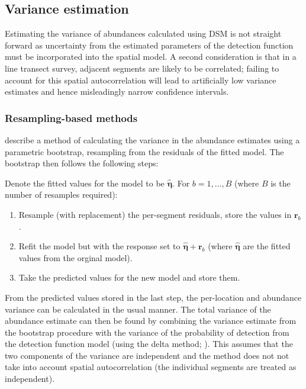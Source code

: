 \documentclass[a4paper,12pt]{article}
\begin{document}
\subsection*{Variance estimation}

Estimating the variance of abundances calculated using DSM is not straight forward as uncertainty from the estimated parameters of the detection function must be incorporated into the spatial model. A second consideration is that in a line transect survey, adjacent segments are likely to be correlated; failing to account for this spatial autocorrelation will lead to artificially low variance estimates and hence misleadingly narrow confidence intervals.

\subsubsection*{Resampling-based methods}

\cite{Hedley:2004et} describe a method of calculating the variance in the abundance estimates using a parametric bootstrap, resampling from the residuals of the fitted model. The bootstrap then follows the following steps:

Denote the fitted values for the model to be $\hat{\bm{\eta}}$. For $b=1,\ldots,B$ (where $B$ is the number of resamples required):
\begin{enumerate}
	\item Resample (with replacement) the per-segment residuals, store the values in $\mathbf{r}_{b}$.
	\item Refit the model but with the response set to $\hat{\bm{\eta}}+\mathbf{r}_{b}$ (where $\hat{\bm{\eta}}$ are the fitted values from the orginal model).
	\item Take the predicted values for the new model and store them.
\end{enumerate}
From the predicted values stored in the last step, the per-location and abundance variance can be calculated in the usual manner. The total variance of the abundance estimate can then be found by combining the variance estimate from the bootstrap procedure with the variance of the probability of detection from the detection function model (using the delta method; \cite{Seber:2002ti}). This assumes that the two components of the variance are independent and the method does not not take into account spatial autocorrelation (the individual segments are treated as independent).
\end{document}
